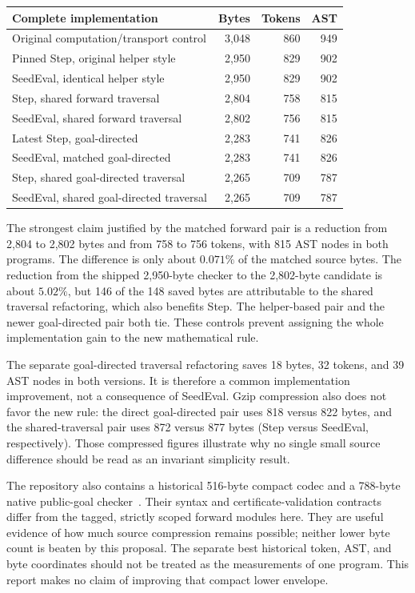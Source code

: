 \documentclass[11pt,letterpaper]{article}
\begin{document}
\begin{center}
\small
\begin{tabularx}{\linewidth}{@{}Xrrr@{}}
\toprule
Complete implementation & Bytes & Tokens & AST\\
\midrule
Original computation/transport control & 3,048 & 860 & 949\\
Pinned Step, original helper style & 2,950 & 829 & 902\\
SeedEval, identical helper style & 2,950 & 829 & 902\\
Step, shared forward traversal & 2,804 & 758 & 815\\
SeedEval, shared forward traversal & 2,802 & 756 & 815\\
Latest Step, goal-directed & 2,283 & 741 & 826\\
SeedEval, matched goal-directed & 2,283 & 741 & 826\\
Step, shared goal-directed traversal & 2,265 & 709 & 787\\
SeedEval, shared goal-directed traversal & 2,265 & 709 & 787\\
\bottomrule
\end{tabularx}
\end{center}

The strongest claim justified by the matched forward pair is a reduction
from 2,804 to 2,802 bytes and from 758 to 756 tokens, with 815 AST nodes
in both programs. The difference is only about $0.071\%$ of the matched
source bytes. The reduction from the shipped 2,950-byte checker to the
2,802-byte candidate is about $5.02\%$, but 146 of the 148 saved bytes
are attributable to the shared traversal refactoring, which also benefits
Step. The helper-based pair and the newer goal-directed pair both tie.
These controls prevent assigning the whole implementation gain to the
new mathematical rule.

The separate goal-directed traversal refactoring saves 18 bytes, 32 tokens,
and 39 AST nodes in both versions. It is therefore a common implementation
improvement, not a consequence of SeedEval. Gzip compression also does not
favor the new rule: the direct goal-directed pair uses 818 versus 822 bytes,
and the shared-traversal pair uses 872 versus 877 bytes (Step versus
SeedEval, respectively). Those compressed figures illustrate why no single
small source difference should be read as an invariant simplicity result.

The repository also contains a historical 516-byte compact codec and a
788-byte native public-goal checker~\cite{compact,checked}. Their syntax
and certificate-validation contracts differ from the tagged, strictly
scoped forward modules here. They are useful evidence of how much source
compression remains possible; neither lower byte count is beaten by this proposal.
The separate best historical token, AST, and byte coordinates should not
be treated as the measurements of one program. This report makes no
claim of improving that compact lower envelope.
\end{document}

